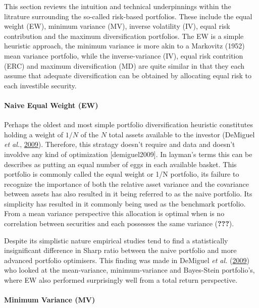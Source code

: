 \documentclass[11pt,preprint, authoryear]{elsarticle}
\numberwithin{equation}{section}
\numberwithin{figure}{section}
\numberwithin{table}{section}
\begin{document}
This section reviews the intuition and technical underpinnings within
the litrature surrounding the so-called risk-based portfolios. These
include the equal weight (EW), minimum variance (MV), inverse volatility
(IV), equal risk contribution and the maximum diversification
portfolios. The EW is a simple heuristic approach, the minimum variance
is more akin to a Markovitz (1952) mean variance portfolio, while the
inverse-variance (IV), equal risk contrition (ERC) and maximum
diversification (MD) are quite similar in that they each assume that
adequate diversification can be obtained by allocating equal risk to
each investible security.

\hypertarget{naive-equal-weight-ew}{%
\paragraph{Naive Equal Weight (EW)}\label{naive-equal-weight-ew}}

Perhaps the oldest and most simple portfolio diversification heuristic
constitutes holding a weight of \(1/N\) of the \(N\) total assets
available to the investor (DeMiguel \emph{et al.},
\protect\hyperlink{ref-demiguel2009}{2009}). Therefore, this stratagy
doesn't require and data and doesn't involdve any kind of optimization
{[}demiguel2009{]}. In layman's terms this can be describes as putting
an equal number of eggs in each available basket. This portfolio is
commonly called the equal weight or 1/N portfolio, its failure to
recognize the importance of both the relative asset variance and the
covariance between assets has also resulted in it being referred to as
the naive portfolio. Its simplicity has resulted in it commonly being
used as the benchmark portfolio. From a mean variance perspective this
allocation is optimal when is no correlation between securities and each
possesses the same variance ({\textbf{???}}).

Despite its simplistic nature empirical studies tend to find a
statistically insignificant difference in Sharp ratio between the naive
portfolio and more advanced portfolio optimisers. This finding was made
in DeMiguel \emph{et al.} (\protect\hyperlink{ref-demiguel2009}{2009})
who looked at the mean-variance, minimum-variance and Bayes-Stein
portfolio's, where EW also performed surprisingly well from a total
return perspective.

\hypertarget{minimum-variance-mv}{%
\paragraph{Minimum Variance (MV)}\label{minimum-variance-mv}}
\end{document}
